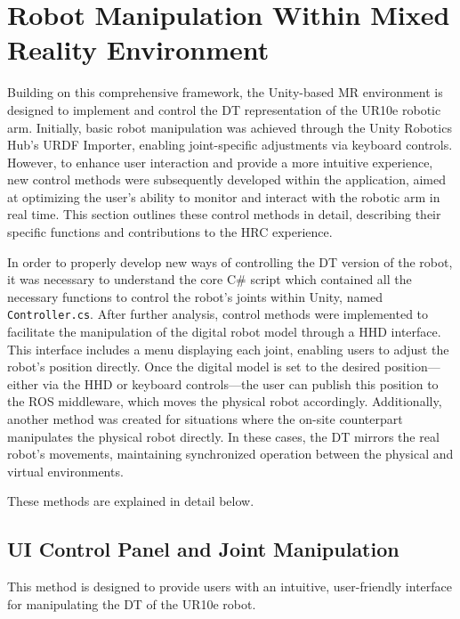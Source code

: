 \section{Robot Manipulation Within Mixed Reality Environment}

Building on this comprehensive framework, the Unity-based \ac{MR} environment is designed to implement and control the \ac{DT} representation of the UR10e robotic arm. Initially, basic robot manipulation was achieved through the Unity Robotics Hub's \ac{URDF} Importer, enabling joint-specific adjustments via keyboard controls. However, to enhance user interaction and provide a more intuitive experience, new control methods were subsequently developed within the application, aimed at optimizing the user’s ability to monitor and interact with the robotic arm in real time. This section outlines these control methods in detail, describing their specific functions and contributions to the \ac{HRC} experience.

In order to properly develop new ways of controlling the \ac{DT} version of the robot, it was necessary to understand the core C\# script which contained all the necessary functions to control the robot's joints within Unity, named \texttt{Controller.cs}. After further analysis, control methods were implemented to facilitate the manipulation of the digital robot model through a \ac{HHD} interface. This interface includes a menu displaying each joint, enabling users to adjust the robot’s position directly. Once the digital model is set to the desired position—either via the \ac{HHD} or keyboard controls—the user can publish this position to the \ac{ROS} middleware, which moves the physical robot accordingly. Additionally, another method was created for situations where the on-site counterpart manipulates the physical robot directly. In these cases, the \ac{DT} mirrors the real robot’s movements, maintaining synchronized operation between the physical and virtual environments.

These methods are explained in detail below.


\subsection{UI Control Panel and Joint Manipulation}
\label{subsection:ui-control-method}
This method is designed to provide users with an intuitive, user-friendly interface for manipulating the \ac{DT} of the UR10e robot. 

